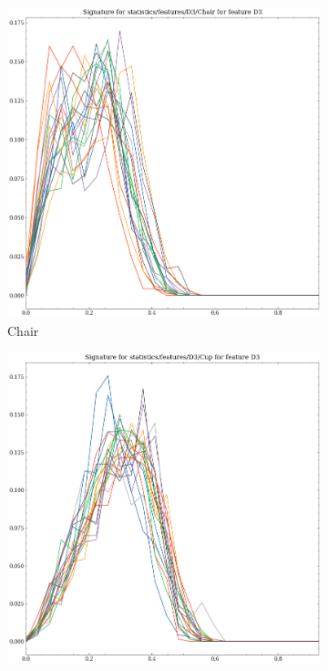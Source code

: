 \begin{figure}[t!p]
    \begin{subfigure}[b]{0.23\textwidth}
        \includegraphics[width=\textwidth]{assets/feature_extraction/D3/Chair.png}
        \caption{Chair}
    \end{subfigure}
    \hfill
    \begin{subfigure}[b]{0.23\textwidth}
        \includegraphics[width=\textwidth]{assets/feature_extraction/D3/Cup.png}

\end{subfigure}
\end{figure}
